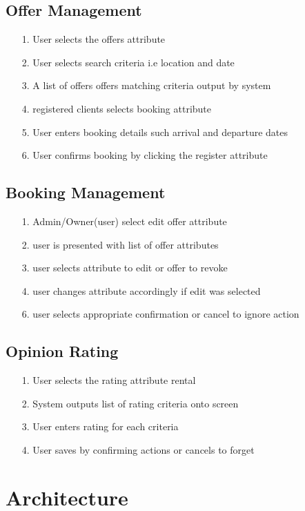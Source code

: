 \subsection {Offer Management}
\begin{itemize}
\item[1.] User selects the offers attribute 
\item[2.] User selects search criteria i.e location and date
\item[3.] A list of offers offers matching criteria output by system
\item[4.] registered clients selects booking attribute 
\item[5.] User enters booking details such arrival and departure dates
\item[6.] User confirms booking by clicking the register attribute
\end{itemize}
\subsection {Booking Management}
 \begin{itemize}
		\item[1.] Admin/Owner(user) select edit offer attribute
		\item[2.] user is presented with list of offer attributes
		\item[3.] user selects attribute to edit or offer to revoke
		\item[4.] user changes attribute accordingly if edit was selected
		\item[6.] user selects appropriate confirmation or cancel to ignore action
\end{itemize}
\subsection {Opinion Rating}
\begin{itemize}
\item[1.] User selects the rating attribute  rental
\item[2.] System outputs list of rating criteria onto screen
\item[3.] User enters rating for each criteria
\item[4.] User saves by confirming actions or cancels to forget
\end{itemize}
\section{Architecture}
